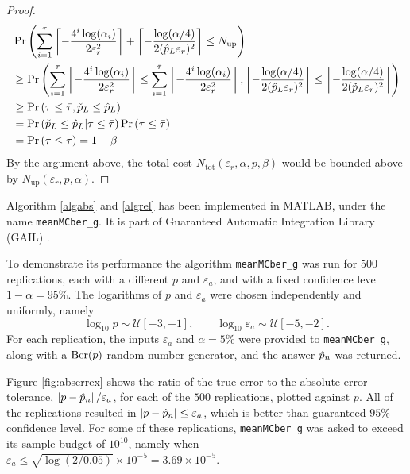 \documentclass{iitthesis}
\theoremstyle{definition}
\begin{document}
\begin{proof}
\begin{align}
&\Pr\left (\sum_{i=1}^{\tau} \left \lceil -\frac{4^i \log(\alpha_i)} {2\varepsilon_r^2 } \right\rceil+\left \lceil -\frac{\log (\alpha/4)}{2  (\hat{p}_L \varepsilon_{r})^2} \right \rceil \leq N_{\text{up}}\right)\\ & \geq \Pr \left(\sum_{i=1}^{\tau} \left \lceil -\frac{4^i \log(\alpha_i)} {2\varepsilon_r^2 } \right\rceil \leq \sum_{i=1}^{\bar{\tau}} \left \lceil -\frac{4^i \log(\alpha_i)} {2\varepsilon_r^2 } \right\rceil , \left \lceil -\frac{\log (\alpha/4)}{2  (\hat{p}_L \varepsilon_{r})^2} \right \rceil \leq \left \lceil -\frac{\log (\alpha/4)}{2  (\check{p}_L \varepsilon_{r})^2} \right \rceil\right)\\&
\geq \Pr \left ( \tau \leq \bar{\tau}, \check{p}_L \leq \hat{p}_L \right ) \\&
 = \Pr \left ( \check{p}_L \leq \hat{p}_L | \tau \leq \bar{\tau}\right )\Pr \left( \tau \leq \bar{\tau}\right) \\&
 = \Pr \left( \tau \leq \bar{\tau}\right) = 1-\beta
\end{align}
By the argument above, the total cost $N_{\text{tot}}(\varepsilon_r,\alpha,p,\beta)$ would be bounded above by $N_{\text{up}}(\varepsilon_r, p,\alpha)$.
\end{proof}

\label{sec:meanMCbergexample}

Algorithm \ref{algabs} and \ref{algrel} has been implemented in MATLAB, under the name {\tt meanMCber\_g}. It is part of Guaranteed Automatic Integration Library (GAIL) \cite{GAIL_2_1}.

To demonstrate its performance the algorithm {\tt meanMCber\_g} was run for $500$ replications, each with a different $p$ and $\varepsilon_a$, and with a fixed confidence level $1-\alpha=95\%$. The logarithms of $p$ and $\varepsilon_a$ were chosen independently and uniformly, namely 
\[
\log_{10} p \sim \mathcal{U}[-3,-1], \qquad \log_{10} \varepsilon_a \sim \mathcal{U}[-5,-2].
\]
For each replication, the inputs $\varepsilon_a$ and $\alpha=5\%$ were provided to {\tt meanMCber\_g}, along with a $\operatorname{Ber}(p)$ random number generator, and the answer $\hat{p}_n$ was returned.  

Figure \ref{fig:abserrex} shows the ratio of the true error to the absolute error tolerance, $\left \lvert p-\hat{p}_n \right \rvert/\varepsilon_a$, for each of the $500$ replications, plotted against $p$.  All of the replications resulted in $\left \lvert p-\hat{p}_n \right \rvert \le \varepsilon_a$, which is better than guaranteed $95\%$ confidence level.  For some of these replications, {\tt meanMCber\_g} was asked to exceed its sample budget of $10^{10}$, namely when $\varepsilon_a \le \sqrt{\log(2/0.05)} \times 10^{-5} = 3.69 \times 10^{-5}$.
\end{document}
